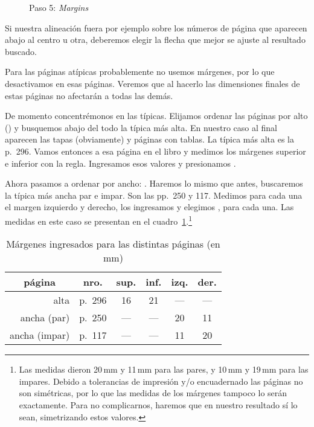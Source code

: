 \documentclass[%
	a5paper,
	10pt,
	twoside,
	openright,
	final,
]{memoir}
\begin{document}
	\begin{figure}
		\hfill
		\caption{Paso 5: \emph{Margins}\label{fig:STmargins}}
	\end{figure}

	Si nuestra alineación fuera por ejemplo sobre los números de página que aparecen abajo al centro u otra, deberemos elegir la flecha que mejor se ajuste al resultado buscado.

	Para las páginas atípicas probablemente no usemos márgenes, por lo que desactivamos  en esas páginas. Veremos que al hacerlo las dimensiones finales de estas páginas no afectarán a todas las demás.

	De momento concentrémonos en las típicas. Elijamos ordenar las páginas por alto () y busquemos abajo del todo la típica más alta. En nuestro caso al final aparecen las tapas (obviamente) y páginas con tablas. La típica más alta es la p.~296. Vamos entonces a esa página en el libro y medimos los márgenes superior e inferior con la regla. Ingresamos esos valores y presionamos .

	Ahora pasamos a ordenar por ancho: . Haremos lo mismo que antes, buscaremos la típica más ancha par e impar. Son las pp.~250 y 117. Medimos para cada una el margen izquierdo y derecho, los ingresamos y elegimos , para cada una. Las medidas en este caso se presentan en el cuadro~\ref{tab:pageMargins}.\footnote{Las medidas dieron 20\,mm y 11\,mm para las pares, y 10\,mm y 19\,mm para las impares. Debido a tolerancias de impresión y/o encuadernado las páginas no son simétricas, por lo que las medidas de los márgenes tampoco lo serán exactamente. Para no complicarnos, haremos que en nuestro resultado sí lo sean, simetrizando estos valores.}

	\begin{table}
		\centering
		\begin{tabular}{@{}rlcccc@{}}
			\toprule
			\multicolumn{1}{c}{página} & \multicolumn{1}{c}{nro.} & sup. & inf. & izq. & der. \\
			\midrule
			alta & p.~296 & 16 & 21 & --- & --- \\
			ancha (par) & p.~250 & --- & --- & 20 & 11 \\
			ancha (impar) & p.~117 & --- & --- & 11 & 20 \\
			\bottomrule
		\end{tabular}
		\caption{Márgenes ingresados para las distintas páginas (en mm)\label{tab:pageMargins}}
	\end{table}
\end{document}
